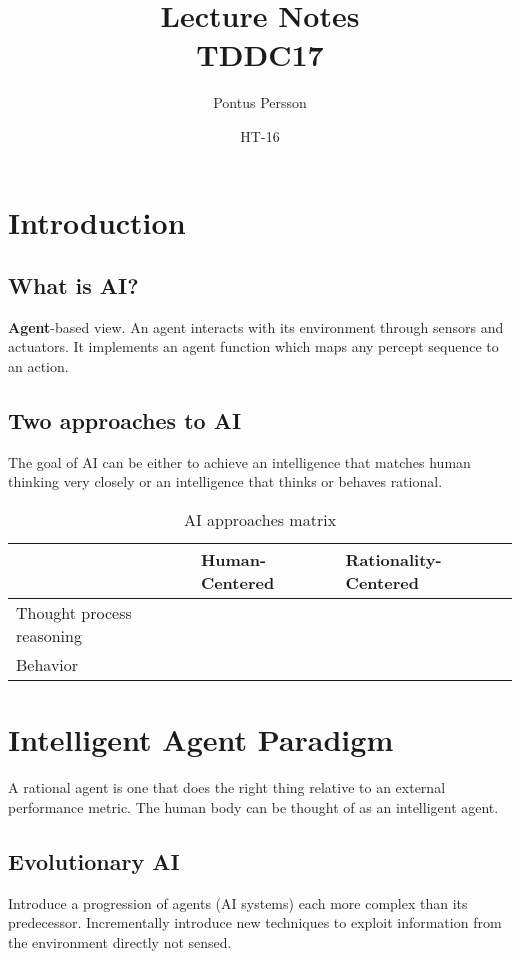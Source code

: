 \documentclass[a4paper]{article}
\author{Pontus Persson}
\title{Lecture Notes\\TDDC17}
\date{HT-16}
\begin{document}
\maketitle
\tableofcontents
\clearpage

\section{Introduction}


\subsection{What is AI?}
\textbf{Agent}-based view. An agent interacts with its environment through 
sensors and actuators. It implements an agent function which maps any percept
sequence to an action.
\subsection{Two approaches to AI}
The goal of AI can be either to achieve an intelligence that matches human
thinking very closely or an intelligence that thinks or behaves rational.
\begin{table}[H]
  \centering
  \begin{tabular}{|l|l|l|}
    \hline
    & Human-Centered & Rationality-Centered \\ \hline
    Thought process reasoning & & \\ \hline
    Behavior & & \\ \hline
  \end{tabular}
  \caption{AI approaches matrix}
  \label{tab:aiapproachesmatrix}
\end{table}

\section{Intelligent Agent Paradigm}

A rational agent is one that does the right thing relative to an external
performance metric. The human body can be thought of as an intelligent agent.

\subsection{Evolutionary AI}

Introduce a progression of agents (AI systems) each more complex than its
predecessor. Incrementally introduce new techniques to exploit information from
the environment directly not sensed.
\end{document}
